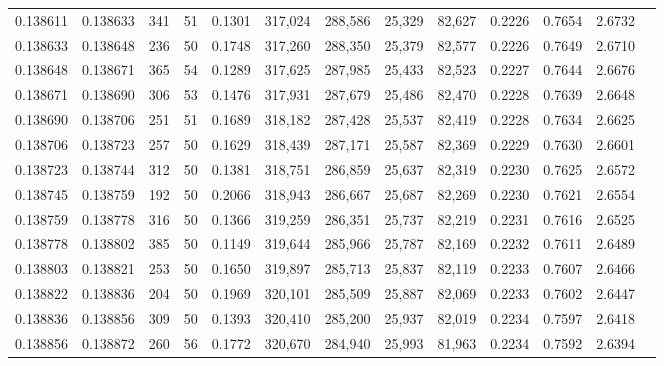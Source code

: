 \begin{tabular}{rrrrrrrrrrrrr}
0.138611 & 0.138633 &   341 &  51 &                                     0.1301 & 317,024 & 288,586 &  25,329 &  82,627 & 0.2226 & 0.7654 & 2.6732 \\
0.138633 & 0.138648 &   236 &  50 &                                     0.1748 & 317,260 & 288,350 &  25,379 &  82,577 & 0.2226 & 0.7649 & 2.6710 \\
0.138648 & 0.138671 &   365 &  54 &                                     0.1289 & 317,625 & 287,985 &  25,433 &  82,523 & 0.2227 & 0.7644 & 2.6676 \\
0.138671 & 0.138690 &   306 &  53 &                                     0.1476 & 317,931 & 287,679 &  25,486 &  82,470 & 0.2228 & 0.7639 & 2.6648 \\
0.138690 & 0.138706 &   251 &  51 &                                     0.1689 & 318,182 & 287,428 &  25,537 &  82,419 & 0.2228 & 0.7634 & 2.6625 \\
0.138706 & 0.138723 &   257 &  50 &                                     0.1629 & 318,439 & 287,171 &  25,587 &  82,369 & 0.2229 & 0.7630 & 2.6601 \\
0.138723 & 0.138744 &   312 &  50 &                                     0.1381 & 318,751 & 286,859 &  25,637 &  82,319 & 0.2230 & 0.7625 & 2.6572 \\
0.138745 & 0.138759 &   192 &  50 &                                     0.2066 & 318,943 & 286,667 &  25,687 &  82,269 & 0.2230 & 0.7621 & 2.6554 \\
0.138759 & 0.138778 &   316 &  50 &                                     0.1366 & 319,259 & 286,351 &  25,737 &  82,219 & 0.2231 & 0.7616 & 2.6525 \\
0.138778 & 0.138802 &   385 &  50 &                                     0.1149 & 319,644 & 285,966 &  25,787 &  82,169 & 0.2232 & 0.7611 & 2.6489 \\
0.138803 & 0.138821 &   253 &  50 &                                     0.1650 & 319,897 & 285,713 &  25,837 &  82,119 & 0.2233 & 0.7607 & 2.6466 \\
0.138822 & 0.138836 &   204 &  50 &                                     0.1969 & 320,101 & 285,509 &  25,887 &  82,069 & 0.2233 & 0.7602 & 2.6447 \\
0.138836 & 0.138856 &   309 &  50 &                                     0.1393 & 320,410 & 285,200 &  25,937 &  82,019 & 0.2234 & 0.7597 & 2.6418 \\
0.138856 & 0.138872 &   260 &  56 &                                     0.1772 & 320,670 & 284,940 &  25,993 &  81,963 & 0.2234 & 0.7592 & 2.6394 \\

\end{tabular}
